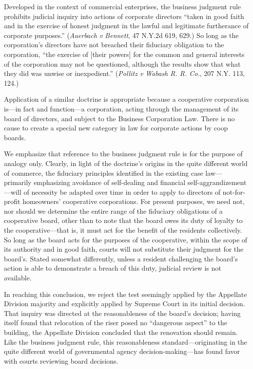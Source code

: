 Developed in the context of commercial enterprises, the business judgment rule
prohibits judicial inquiry into actions of corporate directors ``taken in good
faith and in the exercise of honest judgment in the lawful and legitimate
furtherance of corporate purposes.'' (\textit{Auerbach v Bennett}, 47 N.Y.2d
619, 629.) So long as the corporation's directors have not breached their
fiduciary obligation to the corporation, ``the exercise of [their powers] for
the common and general interests of the corporation may not be questioned,
although the results show that what they did was unwise or inexpedient.''
(\textit{Pollitz v Wabash R. R. Co.}, 207 N.Y. 113, 124.) 

Application of a similar doctrine is appropriate because a cooperative
corporation is---in fact and function---a corporation, acting through the
management of its board of directors, and subject to the Business Corporation
Law. There is no cause to create a special new category in law for corporate
actions by coop boards. 

We emphasize that reference to the business judgment rule is for the purpose of
analogy only. Clearly, in light of the doctrine's origins in the quite different
world of commerce, the fiduciary principles identified in the existing case
law---primarily emphasizing avoidance of self-dealing and financial
self-aggrandizement---will of necessity be adapted over time in order to apply
to directors of not-for-profit homeowners' cooperative corporations. For present
purposes, we need not, nor should we determine the entire range of the fiduciary
obligations of a cooperative board, other than to note that the board owes its
duty of loyalty to the cooperative---that is, it must act for the benefit of
the residents collectively. So long as the board acts for the purposes of the
cooperative, within the scope of its authority and in good faith, courts will
not substitute their judgment for the board's. Stated somewhat differently,
unless a resident challenging the board's action is able to demonstrate a breach
of this duty, judicial review is not available. 

In reaching this conclusion, we reject the test seemingly applied by the
Appellate Division majority and explicitly applied by Supreme Court in its
initial decision. That inquiry was directed at the reasonableness of the board's
decision; having itself found that relocation of the riser posed no ``dangerous
aspect'' to the building, the Appellate Division concluded that the renovation
should remain. Like the business judgment rule, this reasonableness
standard---originating in the quite different world of governmental agency
decision-making---has found favor with courts reviewing board decisions. 

